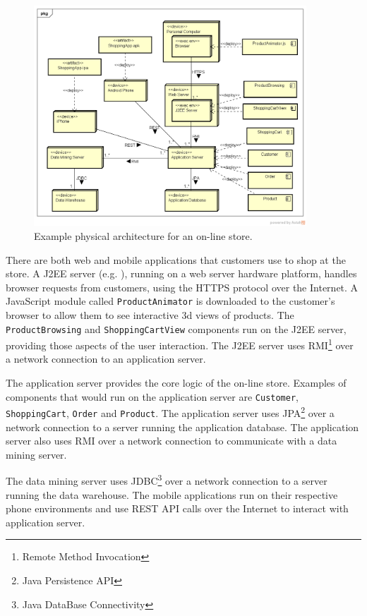 \begin{figure}[h!]
    \centering
    \includegraphics[trim=39 42 25 45,clip,width=0.91\textwidth]{images/uml/deployment_diagram.png}
    \caption{Example physical architecture for an on-line store.}
    \label{fig:deploymentDiagram}
\end{figure}

\noindent
There are both web and mobile applications that customers use to shop at the store.
A J2EE server (e.g. ), running on a web server hardware platform,
handles browser requests from customers, using the HTTPS protocol over the Internet.
A JavaScript module called \texttt{ProductAnimator} is downloaded to the customer's browser to allow them to see interactive 3d views of products.
The \texttt{ProductBrowsing} and \texttt{ShoppingCartView} components run on the J2EE server, providing those aspects of the user interaction.
The J2EE server uses RMI\footnote{Remote Method Invocation} over a network connection to an application server.

The application server provides the core logic of the on-line store.
Examples of components that would run on the application server are \texttt{Customer}, \texttt{ShoppingCart}, \texttt{Order} and \texttt{Product}.
The application server uses JPA\footnote{Java Persistence API} over a network connection to a server running the application database.
The application server also uses RMI over a network connection to communicate with a data mining server.

The data mining server uses JDBC\footnote{Java DataBase Connectivity} over a network connection to a server running the data warehouse.
The mobile applications run on their respective phone environments and use REST API calls over the Internet to interact with application server.

